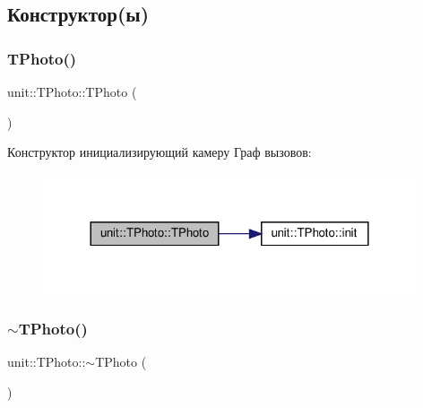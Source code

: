 \subsection{Конструктор(ы)}
\mbox{\label{classunit_1_1_t_photo_ac4d5d37e712767fa9b899648949b2ef3}} 
\subsubsection{\texorpdfstring{T\+Photo()}{TPhoto()}}
{\footnotesize\ttfamily unit\+::\+T\+Photo\+::\+T\+Photo (\begin{DoxyParamCaption}{ }\end{DoxyParamCaption})}



 Конструктор инициализирующий камеру Граф вызовов\+:\nopagebreak
\begin{figure}[H]
\begin{center}
\leavevmode
\includegraphics[width=312pt]{classunit_1_1_t_photo_ac4d5d37e712767fa9b899648949b2ef3_cgraph}
\end{center}
\end{figure}
\mbox{\label{classunit_1_1_t_photo_a1c9c83e03a16b4e66a0fc48f734a5b93}} 
\subsubsection{\texorpdfstring{$\sim$\+T\+Photo()}{~TPhoto()}}
{\footnotesize\ttfamily unit\+::\+T\+Photo\+::$\sim$\+T\+Photo (\begin{DoxyParamCaption}{ }\end{DoxyParamCaption})\hspace{0.3cm}{\ttfamily [virtual]}}



